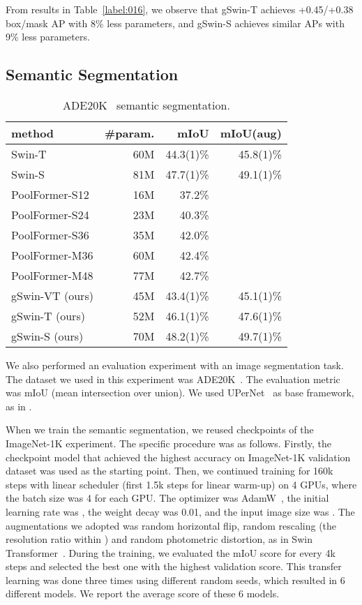 \documentclass{article}
\begin{document}
From results in Table~\ref{label:016}, we observe that gSwin-T achieves +0.45/+0.38 box/mask AP with 8\% less parameters, and gSwin-S achieves similar APs with 9\% less parameters.

\subsection{Semantic Segmentation}
\begin{table}[!t]
	\centering
	{
	\begin{tabular}{lrrr}
		\toprule
		method          & \#param. & mIoU    & mIoU(aug) \\ \midrule
		Swin-T
		& 60M      & 44.3(1)\% & 45.8(1)\% \\
		Swin-S
		& 81M      & 47.7(1)\% & 49.1(1)\% \\ \midrule
		PoolFormer-S12
		& 16M & 37.2\% & \\
		PoolFormer-S24
		& 23M & 40.3\% & \\
		PoolFormer-S36
		& 35M & 42.0\% & \\
		PoolFormer-M36
		& 60M & 42.4\% & \\
		PoolFormer-M48
		& 77M & 42.7\% & \\ \midrule
		gSwin-VT (ours) & 45M      & 43.4(1)\% & 45.1(1)\%   \\
		gSwin-T (ours)  & 52M      & 46.1(1)\% & 47.6(1)\%   \\
		gSwin-S (ours)  & 70M      & 48.2(1)\% & 49.7(1)\%   \\
		\bottomrule
	\end{tabular}
	}
	\caption{
		ADE20K~\cite{zhou2019semantic} semantic segmentation.
	}
	\label{label:017}
\end{table}
We also performed an evaluation experiment with an image segmentation task. The dataset we used in this experiment was ADE20K~\citep{zhou2019semantic}. The evaluation metric was mIoU (mean intersection over union).
We used UPerNet~\citep{xiao2018unified} as base framework, as in \citep{liu2021swin}.

When we train the semantic segmentation, we reused checkpoints of the ImageNet-1K experiment.
The specific procedure was as follows. Firstly, the checkpoint model that achieved the highest accuracy on ImageNet-1K validation dataset was used as the starting point. Then, we continued training for 160k steps with linear scheduler (first 1.5k steps for linear warm-up) on 4 GPUs, where the batch size was 4 for each GPU. The optimizer was AdamW~\citep{kingma2014adam}, the initial learning rate was , the weight decay was 0.01, and the input image size was . The augmentations we adopted was random horizontal flip, random rescaling (the resolution ratio within ) and random photometric distortion, as in Swin Transformer~\citep{liu2021swin}. During the training, we evaluated the mIoU score for every 4k steps and selected the best one with the highest validation score. This transfer learning was done three times using different random seeds, which resulted in 6 different models. We report the average score of these 6 models.
\end{document}
